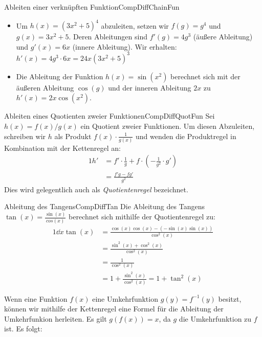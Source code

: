 \begin{example}{Ableiten einer verknüpften Funktion}{CompDiffChainFun}
    \begin{itemize}
        \item Um $h(x) = (3x^2+5)^4$ abzuleiten, setzen wir $f(g) = g^4$ und $g(x) = 3x^2+5$. Deren Ableitungen sind $f'(g) = 4g^3$ (äußere Ableitung) und $g'(x) = 6x$ (innere Ableitung). Wir erhalten: $h'(x) = 4g^3 \cdot 6x = 24x(3x^2+5)^3$
        \item Die Ableitung der Funktion $h(x) = \sin(x^2)$ berechnet sich mit der äußeren Ableitung $\cos(g)$ und der inneren Ableitung $2x$ zu $h'(x) = 2x\cos(x^2)$.
    \end{itemize}
\end{example}

\begin{example}{Ableiten eines Quotienten zweier Funktionen}{CompDiffQuotFun}
    Sei $h(x) = f(x) / g(x)$ ein Quotient zweier Funktionen. Um diesen Abzuleiten, schreiben wir $h$ als Produkt $f(x) \cdot \frac{1}{g(x)}$ und wenden die Produktregel in Kombination mit der Kettenregel an:
    \begin{alignat*}{1}
        h' &= f' \cdot \frac{1}{g} + f \cdot \left(-\frac{1}{g^2} \cdot g'\right) \\
           &= \frac{f'g - fg'}{g^2}
    \end{alignat*}
    Dies wird gelegentlich auch als \emph{Quotientenregel} bezeichnet.
\end{example}

\begin{example}{Ableitung des Tangens}{CompDiffTan}
    Die Ableitung des Tangens $\tan(x) = \frac{\sin(x)}{cos(x)}$ berechnet sich mithilfe der Quotientenregel zu:
    \begin{alignat*}{1}
        \dd{}{x} \tan(x) &= \frac{\cos(x)\cos(x)-(-\sin(x)\sin(x))}{\cos^2(x)} \\
                         &= \frac{\sin^2(x) + \cos^2(x)}{\cos^2(x)} \\
                         &= \frac{1}{\cos^2(x)} \\
                         &= 1+\frac{\sin^2(x)}{\cos^2(x)} = 1 + \tan^2(x)
    \end{alignat*}
\end{example}

Wenn eine Funktion $f(x)$ eine Umkehrfunktion $g(y) = f^{-1}(y)$ besitzt, können wir mithilfe der Kettenregel eine Formel für die Ableitung der Umkehrfunkion herleiten. Es gilt $g(f(x)) = x$, da $g$ die Umkehrfunktion zu $f$ ist. Es folgt:

